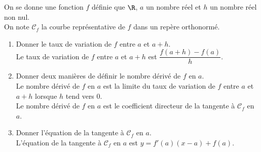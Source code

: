 \documentclass[a4paper,11pt,exos]{nsi}
\begin{document}
\maketitle


On se donne une fonction $f$ définie que $\R$, $a$ un nombre réel et $h$ un nombre réel non nul.\\
On note $\mathcal{C}_f$ la courbe représentative de $f$ dans un repère orthonormé.
\begin{enumerate}
    \item Donner le taux de variation de $f$ entre $a$ et $a+h$.\\[.5em]
    \textcolor{UGLiBlue}{
        Le taux de variation de $f$ entre $a$ et $a+h$ est $\dfrac{f(a+h)-f(a)}{h}$.
    }
    \item Donner deux manières de définir le nombre dérivé de $f$ en $a$.\\[.5em]
    \textcolor{UGLiBlue}{
        Le nombre dérivé de $f$ en $a$ est la limite du taux de variation de $f$ entre $a$ et $a+h$ lorsque $h$ tend vers 0.\\
        Le nombre dérivé de $f$ en $a$ est le coefficient directeur de la tangente à $\mathcal{C}_f$ en $a$.
    }
    \item Donner l'équation de la tangente à $\mathcal{C}_f$ en $a$.\\[.5em]
    \textcolor{UGLiBlue}{
        L'équation de la tangente à $\mathcal{C}_f$ en $a$ est $y=f'(a)(x-a)+f(a)$.
    }
\end{enumerate}


{
}
\end{document}
